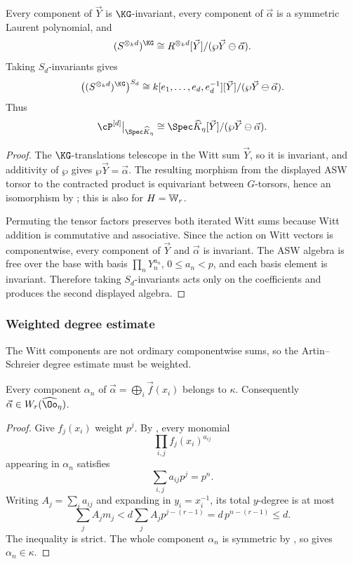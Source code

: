 \begin{prop}
\label{prop:witt_cover_identification}
Every component of $\vec Y$ is $\KG$-invariant, every component of
$\vec\alpha$ is a symmetric Laurent polynomial, and
\[
 (S^{\otimes_k d})^{\KG}
 \cong
 R^{\otimes_k d}[\vec Y]/(\wp\vec Y\ominus\vec\alpha).
\]
Taking $S_d$-invariants gives
\[
 \bigl((S^{\otimes_k d})^{\KG}\bigr)^{S_d}
 \cong
 k[e_1,\dots,e_d,e_d^{-1}][\vec Y]
      /(\wp\vec Y\ominus\vec\alpha).
\]
Thus
\[
  \cP^{[d]}\big|_{\Spec\widehat K_\eta}
   \cong
  \Spec\widehat K_\eta[\vec Y]/(\wp\vec Y\ominus\vec\alpha).
\]
\end{prop}
\begin{proof}
The $\KG$-translations telescope in the Witt sum $\vec Y$, so it is invariant,
and additivity of $\wp$ gives $\wp\vec Y=\vec\alpha$. The resulting morphism
from the displayed ASW torsor to the contracted product is equivariant between
$G$-torsors, hence an isomorphism by ; this is
also  for $H=\mathbb{W}_r$.

Permuting the tensor factors preserves both iterated Witt sums because Witt
addition is commutative and associative. Since the action on Witt vectors is
componentwise, every component of $\vec Y$ and $\vec\alpha$ is invariant. The
ASW algebra is free over the base with basis
$\prod_nY_n^{a_n}$, $0\leq a_n<p$, and each basis element is invariant.
Therefore taking $S_d$-invariants acts only on the coefficients and produces
the second displayed algebra.
\end{proof}

\subsubsection*{Weighted degree estimate}

The Witt components are not ordinary componentwise sums, so the
Artin--Schreier degree estimate must be weighted.

\begin{theorem}
\label{theorem:witt_components_regularity}
Every component $\alpha_n$ of
$\vec\alpha=\bigoplus_i\vec f(x_i)$ belongs to $\kappa$. Consequently
$\vec\alpha\in W_r(\widehat\Oo_\eta)$.
\end{theorem}
\begin{proof}
Give $f_j(x_i)$ weight $p^j$. By
, every monomial
\[
   \prod_{i,j}f_j(x_i)^{a_{ij}}
\]
appearing in $\alpha_n$ satisfies
\[
   \sum_{i,j}a_{ij}p^j=p^n.
\]
Writing $A_j=\sum_i a_{ij}$ and expanding in $y_i=x_i^{-1}$, its total
$y$-degree is at most
\[
 \sum_jA_jm_j
   <d\sum_jA_jp^{j-(r-1)}
   =d\,p^{n-(r-1)}\leq d.
\]
The inequality is strict. The whole component $\alpha_n$ is symmetric by
, so
 gives $\alpha_n\in\kappa$.
\end{proof}


